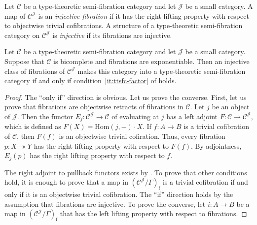 \documentclass[reqno]{amsart}
\theoremstyle{definition}
\theoremstyle{remark}
\newcommand{\fs}[1]{\mathrm{#1}}
\newcommand{\scat}[1]{\mathcal{#1}}
\newcommand{\Hom}{\fs{Hom}}
\numberwithin{figure}{section}
\begin{document}
Let $\scat{C}$ be a type-theoretic semi-fibration category and let $\scat{J}$ be a small category.
A map of $\scat{C}^\scat{J}$ is an \emph{injective fibration} if it has the right lifting property with respect to objectwise trivial cofibrations.
A structure of a type-theoretic semi-fibration category on $\scat{C}^\scat{J}$ is \emph{injective} if its fibrations are injective.

\begin{prop}[injective]
Let $\scat{C}$ be a type-theoretic semi-fibration category and let $\scat{J}$ be a small category.
Suppose that $\scat{C}$ is bicomplete and fibrations are exponentiable.
Then an injective class of fibrations of $\scat{C}^\scat{J}$ makes this category into a type-theoretic semi-fibration category if and only if condition~\eqref{it:ttsfc-factor} of  holds.
\end{prop}
\begin{proof}
The ``only if'' direction is obvious.
Let us prove the converse.
First, let us prove that fibrations are objectwise retracts of fibrations in $\scat{C}$.
Let $j$ be an object of $\scat{J}$.
Then the functor $E_j : \scat{C}^\scat{J} \to \scat{C}$ of evaluating at $j$ has a left adjoint $F : \scat{C} \to \scat{C}^\scat{J}$, which is defined as $F(X) = \Hom(j,-) \cdot X$.
If $f : A \to B$ is a trivial cofibration of $\scat{C}$, then $F(f)$ is an objectwise trivial cofiration.
Thus, every fibration $p : X \twoheadrightarrow Y$ has the right lifting property with respect to $F(f)$.
By adjointness, $E_j(p)$ has the right lifting property with respect to $f$.

The right adjoint to pullback functors exists by \cite[Theorem~2.12]{comp-fact-tor}.
To prove that other conditions hold, it is enough to prove that a map in $(\scat{C}^\scat{J}/\Gamma)_\fs{f}$ is a trivial cofibration if and only if it is an objectwise trivial cofibration.
The ``if'' direction holds by the assumption that fibrations are injective.
To prove the converse, let $i : A \to B$ be a map in $(\scat{C}^\scat{J}/\Gamma)_\fs{f}$ that has the left lifting property with respect to fibrations.
\end{proof}
\end{document}

